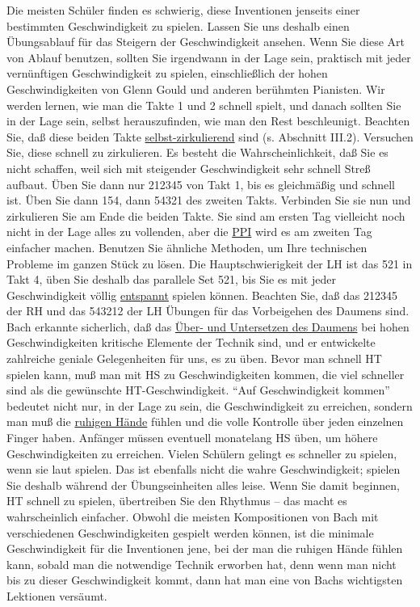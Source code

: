 Die meisten Schüler finden es schwierig, diese Inventionen jenseits einer bestimmten Geschwindigkeit zu spielen.
Lassen Sie uns deshalb einen Übungsablauf für das Steigern der Geschwindigkeit ansehen.
Wenn Sie diese Art von Ablauf benutzen, sollten Sie irgendwann in der Lage sein, praktisch mit jeder vernünftigen Geschwindigkeit zu spielen, einschließlich der hohen Geschwindigkeiten von Glenn Gould und anderen berühmten Pianisten.
Wir werden lernen, wie man die Takte 1 und 2 schnell spielt, und danach sollten Sie in der Lage sein, selbst herauszufinden, wie man den Rest beschleunigt.
Beachten Sie, daß diese beiden Takte \hyperref[c1iii2]{selbst-zirkulierend} sind (s. Abschnitt III.2).
Versuchen Sie, diese schnell zu zirkulieren.
Es besteht die Wahrscheinlichkeit, daß Sie es nicht schaffen, weil sich mit steigender Geschwindigkeit sehr schnell Streß aufbaut.
Üben Sie dann nur 212345 von Takt 1, bis es gleichmäßig und schnell ist.
Üben Sie dann 154, dann 54321 des zweiten Takts.
Verbinden Sie sie nun und zirkulieren Sie am Ende die beiden Takte.
Sie sind am ersten Tag vielleicht noch nicht in der Lage alles zu vollenden, aber die \hyperref[c1ii15]{PPI} wird es am zweiten Tag einfacher machen.
Benutzen Sie ähnliche Methoden, um Ihre technischen Probleme im ganzen Stück zu lösen.
Die Hauptschwierigkeit der LH ist das 521 in Takt 4, üben Sie deshalb das parallele Set 521, bis Sie es mit jeder Geschwindigkeit völlig \hyperref[c1ii14]{entspannt} spielen können.
Beachten Sie, daß das 212345 der RH und das 543212 der LH Übungen für das Vorbeigehen des Daumens sind.
Bach erkannte sicherlich, daß das \hyperref[c1iii5a]{Über- und Untersetzen des Daumens} bei hohen Geschwindigkeiten kritische Elemente der Technik sind, und er entwickelte zahlreiche geniale Gelegenheiten für uns, es zu üben.
Bevor man schnell HT spielen kann, muß man mit HS zu Geschwindigkeiten kommen, die viel schneller sind als die gewünschte HT-Geschwindigkeit.
\enquote{Auf Geschwindigkeit kommen} bedeutet nicht nur, in der Lage zu sein, die Geschwindigkeit zu erreichen, sondern man muß die \hyperref[ruhig]{ruhigen Hände} fühlen und die volle Kontrolle über jeden einzelnen Finger haben.
Anfänger müssen eventuell monatelang HS üben, um höhere Geschwindigkeiten zu erreichen.
Vielen Schülern gelingt es schneller zu spielen, wenn sie laut spielen.
Das ist ebenfalls nicht die wahre Geschwindigkeit; spielen Sie deshalb während der Übungseinheiten alles leise.
Wenn Sie damit beginnen, HT schnell zu spielen, übertreiben Sie den Rhythmus -- das macht es wahrscheinlich einfacher.
Obwohl die meisten Kompositionen von Bach mit verschiedenen Geschwindigkeiten gespielt werden können, ist die minimale Geschwindigkeit für die Inventionen jene, bei der man die ruhigen Hände fühlen kann, sobald man die notwendige Technik erworben hat, denn wenn man nicht bis zu dieser Geschwindigkeit kommt, dann hat man eine von Bachs wichtigsten Lektionen versäumt.

